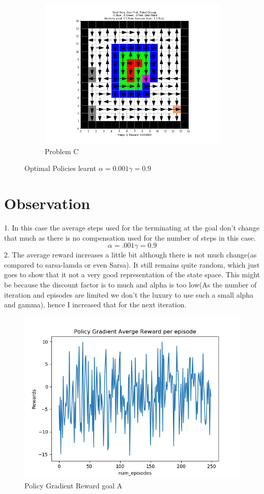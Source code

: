 \documentclass[12pt, letterpaper, twoside]{report}
\begin{document}
\begin{figure}[h!]
  \begin{subfigure}[b]{0.5\linewidth}
    \includegraphics[width=0.8\linewidth]{Policy_Gradient_Problem_C.png}
    \caption{Problem C}
  \end{subfigure}
  \caption{Optimal Policies learnt $\alpha = 0.001 \gamma = 0.9$}
  \label{fig:Softamx}
\end{figure}
\newpage
\par
 \section*{Observation}
 1. In this case the average steps used for the terminating at the goal don't change that much as there is no compensation used for the number of steps in this case.\newline
 \[ \alpha  = .001 \gamma = 0.9\]
 2. The average reward increases a little bit although there is not much change(as compared to sarsa-lamda or even Sarsa). It still remains quite random, which just goes to show that it not a very good representation of the state space. This might be because the discount factor is to much and alpha is too low(As the number of iteration and episodes are limited we don't the luxury to use such a small alpha and gamma), hence I increased that for the next iteration.\newline
 \begin{figure}[h!]
  \centering
    \includegraphics[width=0.5\linewidth]{Policy_Gradient_Averages_reward goal a.png}
  \caption{Policy Gradient Reward goal A}
\end{figure}
 \newpage
 
\end{document}
